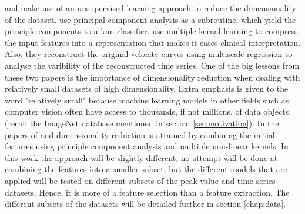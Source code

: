 \textcite{hf_diagnosis_ml} and \textcite{myocardial_motion_pattern} make use of an unsupervised learning approach to reduce the dimensionality of the dataset. \textcite{hf_diagnosis_ml} use principal component analysis as a subroutine, which yield the principle components to a \acrshort{knn} classifier. \textcite{myocardial_motion_pattern} use multiple kernal learning to compress the input features into a representation that makes it eases clinical interpretation. Also, they reconstruct the original velocity curves using multiscale regression to analyse the varibility of the reconstructed time series. One of the big lessons from these two papers is the importance of dimensionality reduction when dealing with relatively small datasets of high dimensionality. Extra emphasis is given to the word "relatively small" because machine learning models in other fields such as computer vision often have access to thousands, if not millions, of data objects (recall the ImageNet database mentioned in section \ref{sec:motivation}). In the papers of \textcite{hf_diagnosis_ml} and \textcite{myocardial_motion_pattern} dimensionality reduction is attained by combining the initial features using principle component analysis and multiple non-linear kernels. In this work the approach will be slightly different, no attempt will be done at combining the features into a smaller subset, but the different models that are applied will be tested on different subsets of the peak-value and time-series datasets. Hence, it is more of a feature selection than a feature extraction. The different subsets of the datasets will be detailed further in section \ref{chap:data}.
